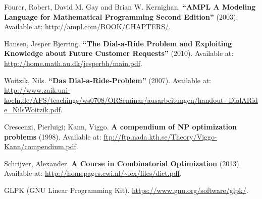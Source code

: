 \documentclass{article}
\begin{document}
\begin{thebibliography}{1}
Fourer, Robert, David M. Gay and Brian W. Kernighan. \textbf{“AMPL A Modeling Language for Mathematical Programming Second Edition”} (2003). Available at: \url{http://ampl.com/BOOK/CHAPTERS/}.

Hansen, Jesper Bjerring. \textbf{“The Dial-a-Ride Problem and Exploiting Knowledge about Future Customer Requests”} (2010). Available at: \url{http://home.math.au.dk/jesperbh/main.pdf}.

Woitzik, Nils. \textbf{“Das Dial-a-Ride-Problem”} (2007). Available at: \url{http://www.zaik.uni-koeln.de/AFS/teachings/ws0708/ORSeminar/ausarbeitungen/handout_DialARide_NilsWoitzik.pdf}.

Crescenzi, Pierluigi; Kann, Viggo. \textbf{A compendium of NP optimization problems} (1998). Available at: \url{ftp://ftp.nada.kth.se/Theory/Viggo-Kann/compendium.pdf}.

Schrijver, Alexander. \textbf{A Course in Combinatorial Optimization} (2013). Available at: \url{http://homepages.cwi.nl/~lex/files/dict.pdf}.

GLPK (GNU Linear Programming Kit). \url{https://www.gnu.org/software/glpk/}.

\end{thebibliography}
\end{document}
